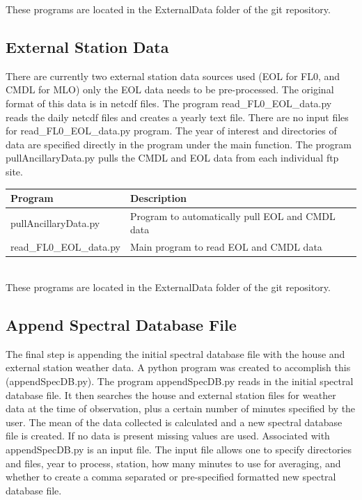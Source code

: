\documentclass[12pt, letterpaper]{article}
\begin{document}
These programs are located in the ExternalData folder of the git repository.


\subsection{External Station Data}
\label{sec:ED}

There are currently two external station data sources used (EOL for FL0, and CMDL for MLO) only the EOL data needs to be pre-processed. The original format of this data is in netcdf files. The program read\_FL0\_EOL\_data.py reads the daily netcdf files and creates a yearly text file. There are no input files for read\_FL0\_EOL\_data.py program. The year of interest and directories of data are specified directly in the program under the main function.  The program pullAncillaryData.py pulls the CMDL and EOL data from each individual ftp site. \\

\begin{tabular}{ l l }
\textbf{Program} & \textbf{Description} \\
\hline
pullAncillaryData.py    & Program to automatically pull EOL and CMDL data\\
read\_FL0\_EOL\_data.py & Main program to read EOL and CMDL data \\
\end{tabular} \\

These programs are located in the ExternalData folder of the git repository.

\subsection{Append Spectral Database File}
\label{sec:ASDF}
The final step is appending the initial spectral database file with the house and external station weather data. A python program was created to accomplish this (appendSpecDB.py). The program appendSpecDB.py reads in the initial spectral database file. It then searches the house and external station files for weather data at the time of observation, plus a certain number of minutes specified by the user. The mean of the data collected is calculated and a new spectral database file is created. If no data is present missing values are used. Associated with appendSpecDB.py is an input file. The input file allows one to specify directories and files, year to process, station, how many minutes to use for averaging, and whether to create a comma separated or pre-specified formatted new spectral database file.\\
\end{document}
